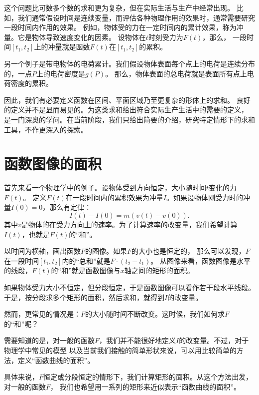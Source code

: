 \documentclass[12pt,UTF8]{ctexbook}
\begin{document}
这个问题比可数多个数的求和更为复杂，但在实际生活与生产中经常出现。
比如，我们通常假设时间是连续变量，而评估各种物理作用的效果时，通常需要研究一段时间内作用的效果。
例如，物体受的力在一定时间内的累计效果，称为冲量。它是物体导致速度变化的因素。
设物体在$t$时刻受力为$F(t)$，那么，
一段时间$[t_1, t_2]$上的冲量就是函数$F(t)$在$[t_1, t_2]$的累积。

另一个例子是带电物体的电荷累计。我们假设物体表面每个点上的电荷是连续分布的，一点$P$上的电荷密度是$g(P)$。
那么，物体表面的总电荷就是表面所有点上电荷密度的累积。

因此，我们有必要定义函数在区间、平面区域乃至更复杂的形体上的求和。
良好的定义并不是显而易见的。为这类求和给出符合实际生产生活中的需要的定义，
是一门深奥的学问。在当前阶段，我们只给出简要的介绍，研究特定情形下的求和工具，不作更深入的探索。

\section{函数图像的面积}

首先来看一个物理学中的例子。设物体受到方向恒定，大小随时间$t$变化的力$F(t)$。
定义$F(t)$在一段时间内的累积效果为冲量$I$。如果设物体刚受力时的冲量$I(0) = 0$，那么有定律：
$$ I(t) - I(0) = m(v(t) - v(0)).$$
其中$v$是物体的在受力方向上的速率。为了计算速率的改变量，我们希望计算$I(t)$，也就是$F(t)$的“和”。

以时间为横轴，画出函数$F$的图像。如果$F$的大小也是恒定的，
那么可以发现，$F$在一段时间$[t_1, t_2]$内的“总和”就是$F \cdot (t_2 - t_1)$。
从图像来看，函数图像是水平的线段，$F(t)$的“和”就是函数图像与$x$轴之间的矩形的面积。

如果物体受力大小不恒定，但分段恒定，于是函数图像可以看作若干段水平线段。
于是，按分段求多个矩形的面积，然后求和，就得到$I$的改变量。

然而，更常见的情况是：$F$的大小随时间不断改变。这时候，我们如何求$F$的“和”呢？

需要知道的是，对一般的函数$F$，我们并不能很好地定义$I$的改变量。不过，对于物理学中常见的模型
以及当前我们接触的简单形状来说，可以用比较简单的方法，定义“函数曲线的面积”。

具体来说，$F$恒定或分段恒定的情形下，我们计算矩形的面积。从这个方法出发，对一般的函数$F$，
我们也希望用一系列的矩形来近似表示“函数曲线的面积”。

\end{document}
